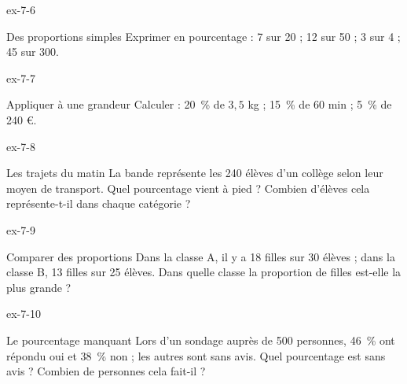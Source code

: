 \begin{blocLivre}{ex-7-6}\begin{exercice}[2]{Des proportions simples}
Exprimer en pourcentage : 7 sur 20 ; 12 sur 50 ; 3 sur 4 ; 45 sur 300.
\end{exercice}\end{blocLivre}
\begin{blocLivre}{ex-7-7}\begin{exercice}[2]{Appliquer à une grandeur}
Calculer : 20~\% de $3{,}5$ kg ; 15~\% de 60 min ; 5~\% de 240 €.
\end{exercice}\end{blocLivre}
\begin{blocLivre}{ex-7-8}\begin{exercice}[2]{Les trajets du matin}
La bande représente les 240 élèves d’un collège selon leur moyen de transport. Quel pourcentage vient à pied ? Combien d’élèves cela représente-t-il dans chaque catégorie ?
\label{fig-ex-7-8}
\end{exercice}\end{blocLivre}
\begin{blocLivre}{ex-7-9}\begin{exercice}[2]{Comparer des proportions}
Dans la classe A, il y a 18 filles sur 30 élèves ; dans la classe B, 13 filles sur 25 élèves. Dans quelle classe la proportion de filles est-elle la plus grande ?
\end{exercice}\end{blocLivre}
\begin{blocLivre}{ex-7-10}\begin{exercice}[2]{Le pourcentage manquant}
Lors d’un sondage auprès de 500 personnes, 46~\% ont répondu oui et 38~\% non ; les autres sont sans avis. Quel pourcentage est sans avis ? Combien de personnes cela fait-il ?
\end{exercice}\end{blocLivre}

